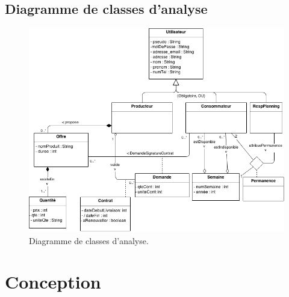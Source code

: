 \documentclass[12pt]{report}
\begin{document}
\subsection{Diagramme de classes d'analyse}
\begin{figure}[!Hb]
\centering
\includegraphics[height=.9\textwidth]{./ressources/class_analyse.png}
\caption{Diagramme de classes d'analyse.}
\vspace{50mm}
\end{figure}
\clearpage


\section{Conception}
\end{document}
